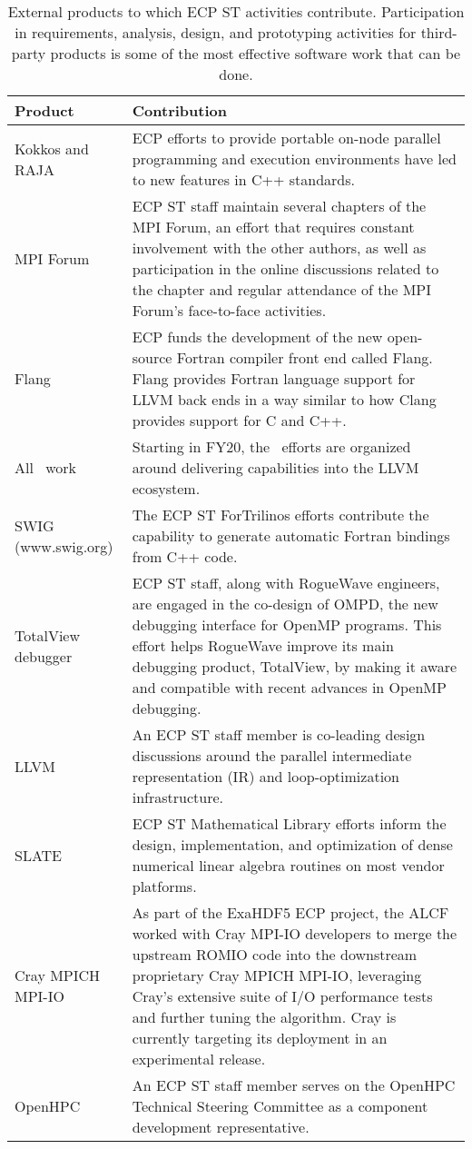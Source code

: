\begin{table}
	\begin{tabular}{|L{1.5in}|L{4in}|}\hline
			Product & Contribution\\\hline
			Kokkos and RAJA & ECP efforts to provide portable on-node parallel programming and execution environments have led to new features in C++ standards. \\\hline
			MPI Forum & ECP ST staff maintain several chapters of the MPI Forum, an effort that requires constant involvement with the other authors, as well as participation in the online discussions related to the chapter and regular attendance of the MPI Forum's face-to-face activities.\\\hline
			Flang & ECP funds the development of the new open-source Fortran compiler front end called Flang. Flang provides Fortran language support for LLVM back ends in a way similar to how Clang provides support for C and C++.\\\hline 
			All \tools\ work & Starting in FY20, the \tools\ efforts are organized around delivering capabilities into the LLVM ecosystem.  \\\hline
			SWIG (www.swig.org) & The ECP ST ForTrilinos efforts contribute the capability to generate automatic Fortran bindings from C++ code.\\\hline
			TotalView debugger & ECP ST staff, along with RogueWave engineers, are engaged in the co-design of OMPD, the new debugging interface for OpenMP programs. This effort helps RogueWave improve its main debugging product, TotalView, by making it aware and compatible with recent advances in OpenMP debugging.\\\hline
			LLVM &  An ECP ST staff member is co-leading design discussions around the parallel intermediate representation (IR) and loop-optimization infrastructure.\\\hline
			SLATE & ECP ST Mathematical Library efforts inform the design, implementation, and optimization of dense numerical linear algebra routines on most vendor platforms.\\\hline
			Cray MPICH MPI-IO & As part of the ExaHDF5 ECP project, the ALCF worked with Cray MPI-IO developers to merge the upstream ROMIO code into the downstream proprietary Cray MPICH MPI-IO, leveraging Cray’s extensive suite of I/O performance tests and further tuning the algorithm.  Cray is currently targeting its deployment in an experimental release.\\\hline
			OpenHPC & An ECP ST staff member serves on the OpenHPC Technical Steering Committee as a component development representative.\\\hline
		\end{tabular}
		\centering
		\caption{\label{table:externalproducts} External products to which ECP ST activities contribute.  Participation in requirements, analysis, design, and prototyping activities for third-party products is some of the most effective software work that can be done.}
	\end{table}
